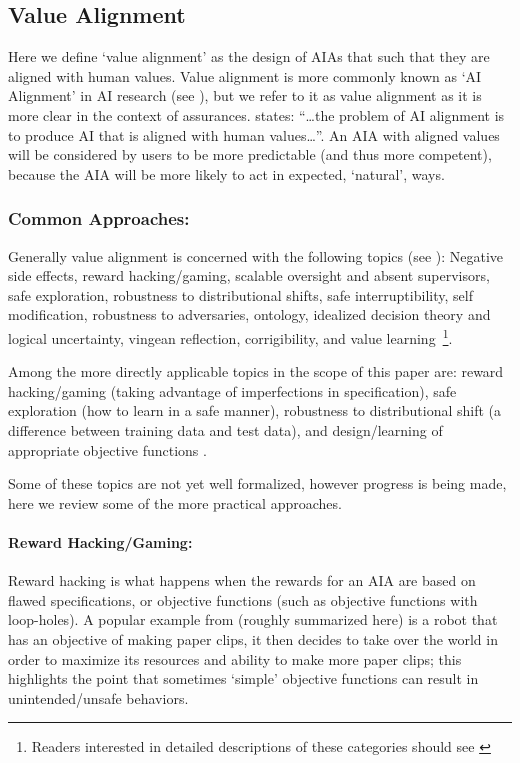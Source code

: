 \subsection{Value Alignment} \label{sec:value_alignment}
Here we define `value alignment' as the design of AIAs that such that they are aligned with human values. Value alignment is more commonly known as `AI Alignment' in AI research (see \cite{Yudkowsky2001-hb,Bensinger2014-ul}), but we refer to it as value alignment as it is more clear in the context of assurances. \citet{Gordon_Worley2018-xy} states: ``\ldots the problem of AI alignment is to produce AI that is aligned with human values\ldots''. An AIA with aligned values will be considered by users to be more predictable (and thus more competent), because the AIA will be more likely to act in expected, `natural', ways.

\subsubsection{Common Approaches:}
Generally value alignment is concerned with the following topics (see \cite{Gordon_Worley2018-xy,Amodei2016-xi}): Negative side effects, reward hacking/gaming, scalable oversight and absent supervisors, safe exploration, robustness to distributional shifts, safe interruptibility, self modification, robustness to adversaries, ontology, idealized decision theory and logical uncertainty, vingean reflection, corrigibility, and value learning~\footnote{Readers interested in detailed descriptions of these categories should see \cite{Gordon_Worley2018-xy,Amodei2016-xi}}.

Among the more directly applicable topics in the scope of this paper are: reward hacking/gaming (taking advantage of imperfections in specification), safe exploration (how to learn in a safe manner), robustness to distributional shift (a difference between training data and test data), and design/learning of appropriate objective functions \cite{Hadfield-Menell2016-ws,Da_Veiga2012-gh,Garcia2015-rs}.

Some of these topics are not yet well formalized, however progress is being made, here we review some of the more practical approaches.

\paragraph{Reward Hacking/Gaming:}
Reward hacking is what happens when the rewards for an AIA are based on flawed specifications, or objective functions (such as objective functions with loop-holes). A popular example from \citet{Bostrom2014-fz} (roughly summarized here) is a robot that has an objective of making paper clips, it then decides to take over the world in order to maximize its resources and ability to make more paper clips; this highlights the point that sometimes `simple' objective functions can result in unintended/unsafe behaviors.

